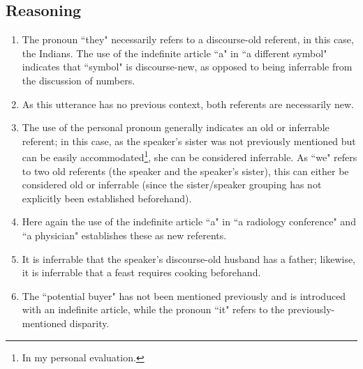 \documentclass[12pt,a4paper]{article}
\begin{document}
\subsection{Reasoning}
\begin{enumerate}

\item The pronoun ``they" necessarily refers to a discourse-old referent, in this case, the Indians. The use of the indefinite article ``a" in ``a different symbol" indicates that ``symbol" is discourse-new, as opposed to being inferrable from the discussion of numbers.

\item As this utterance has no previous context, both referents are necessarily new. 

\item The use of the personal pronoun generally indicates an old or inferrable referent; in this case, as the speaker's sister was not previously mentioned but can be easily accommodated\footnote{In my personal evaluation.}, she can be considered inferrable. As ``we" refers to two old referents (the speaker and the speaker's sister), this can either be considered old or inferrable (since the sister/speaker grouping has not explicitly been established beforehand). 

\item Here again the use of the indefinite article ``a" in ``a radiology conference" and ``a physician" establishes these as new referents.

\item It is inferrable that the speaker's discourse-old husband has a father; likewise, it is inferrable that a feast requires cooking beforehand.

\item The ``potential buyer" has not been mentioned previously and is introduced with an indefinite article, while the pronoun ``it" refers to the previously-mentioned disparity.

\end{enumerate}
\end{document}
